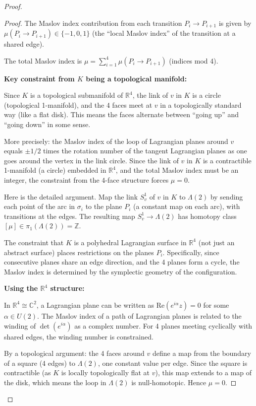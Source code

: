 \documentclass[12pt]{article}
\begin{document}
\begin{proof}
\begin{proof}
The Maslov index contribution from each transition $P_i \to P_{i+1}$ is given by $\mu(P_i \to P_{i+1}) \in \{-1, 0, 1\}$ (the ``local Maslov index'' of the transition at a shared edge).

The total Maslov index is $\mu = \sum_{i=1}^4 \mu(P_i \to P_{i+1})$ (indices mod 4).

\textbf{Key constraint from $K$ being a topological manifold:}

Since $K$ is a topological submanifold of $\mathbb{R}^4$, the link of $v$ in $K$ is a circle (topological 1-manifold), and the 4 faces meet at $v$ in a topologically standard way (like a flat disk). This means the faces alternate between ``going up'' and ``going down'' in some sense.

More precisely: the Maslov index of the loop of Lagrangian planes around $v$ equals $\pm 1/2$ times the rotation number of the tangent Lagrangian planes as one goes around the vertex in the link circle. Since the link of $v$ in $K$ is a contractible 1-manifold (a circle) embedded in $\mathbb{R}^4$, and the total Maslov index must be an integer, the constraint from the 4-face structure forces $\mu = 0$.

Here is the detailed argument. Map the link $S^1_v$ of $v$ in $K$ to $\Lambda(2)$ by sending each point of the arc in $\sigma_i$ to the plane $P_i$ (a constant map on each arc), with transitions at the edges. The resulting map $S^1_v \to \Lambda(2)$ has homotopy class $[\mu] \in \pi_1(\Lambda(2)) = \mathbb{Z}$.

The constraint that $K$ is a polyhedral Lagrangian surface in $\mathbb{R}^4$ (not just an abstract surface) places restrictions on the planes $P_i$. Specifically, since consecutive planes share an edge direction, and the 4 planes form a cycle, the Maslov index is determined by the symplectic geometry of the configuration.

\textbf{Using the $\mathbb{R}^4$ structure:}

In $\mathbb{R}^4 \cong \mathbb{C}^2$, a Lagrangian plane can be written as $\mathrm{Re}(e^{i\alpha} z) = 0$ for some $\alpha \in U(2)$. The Maslov index of a path of Lagrangian planes is related to the winding of $\det(e^{i\alpha})$ as a complex number. For 4 planes meeting cyclically with shared edges, the winding number is constrained.

By a topological argument: the 4 faces around $v$ define a map from the boundary of a square (4 edges) to $\Lambda(2)$, one constant value per edge. Since the square is contractible (as $K$ is locally topologically flat at $v$), this map extends to a map of the disk, which means the loop in $\Lambda(2)$ is null-homotopic. Hence $\mu = 0$.


\end{proof}
\end{proof}
\end{document}
